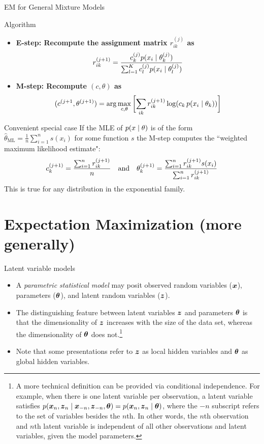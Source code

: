 \documentclass[10pt]{beamer}
\newcommand{\sumn}{\sum_{i=1}^{n}}
\newcommand{\soft}{r} %
\begin{document}
\begin{frame}{EM for General Mixture Models}
\footnotesize
\begin{sblock}{Algorithm}
\begin{itemize}
\item \bf{E-step:} Recompute the assignment matrix $\soft_{ik}^{(j)}$ as
\[ \soft_{ik}^{(j+1)} = \df{c_k^{(j)}  p(x_i \cond \theta_k^{(j)}) }{ \sum_{l=1}^K c_l^{(j)}  p(x_i \cond \theta_l^{(j)})} \]
\item \bf{M-step:} Recompute $(c,\theta)$ as
\[ (c^{(j+1}, \theta^{(j+1)}) = \arg\max_{c, \theta} \bb{ \ds\sum_{ik} \soft_{ik}^{(j+1)} \log (c_k \, p(x_i \cond \theta_k)) } \]
\end{itemize}
\end{sblock}
\begin{sblock}{Convenient special case}
If the MLE of $p(x \; | \; \theta)$ is of the form $\widehat{\theta}_{\text{ML}} =\frac{1}{n} \sumn s(x_i)$ for some function $s$  the M-step computes the ``weighted maximum likelihood estimate":
\[ c_k^{(j+1)}  = \df{\sum_{i=1}^n \soft_{ik}^{(j+1)}}{n} \quad \text{and} \quad \theta_k^{(j+1)} = \df{\sumn \soft_{ik}^{(j+1)} s(x_i)}{ \sumn \soft_{ik}^{(j+1)}}\]
This is true for any distribution in the exponential family.
\end{sblock}
\end{frame}


\section{Expectation Maximization (more generally)}

\begin{frame}{Latent variable models}

\begin{itemize}
\item A \textit{parametric statistical model} may posit observed random variables (${\boldsymbol x}$), parameters (${\boldsymbol \theta}$), and latent random variables (${\boldsymbol z}$).   
\item The distinguishing feature between latent variables ${\boldsymbol z}$ and parameters ${\boldsymbol \theta}$ is that the dimensionality of ${\boldsymbol z}$ increases with the size of the data set, whereas the dimensionality of ${\boldsymbol \theta}$ does not.\footnote{A more technical definition can be provided via conditional independence.  For example, when there is one latent variable per observation, a latent variable satisfies $p({\boldsymbol x}_n,{\boldsymbol z}_n \; | \; {\boldsymbol x}_{-n}, {\boldsymbol z}_{-n}, {\boldsymbol \theta}) = p({\boldsymbol x}_n,{\boldsymbol z}_n \; | \; {\boldsymbol \theta})$, where the $-n$ subscript refers to the set of variables besides the $n$th. In other words, the $n$th observation and $n$th latent variable is independent of all other observations and latent variables, given the model parameters.}  
\item 
 Note that some presentations refer to ${\boldsymbol z}$ as local hidden variables and ${\boldsymbol \theta}$ as global hidden variables.
\end{itemize}

\end{frame}
\end{document}
